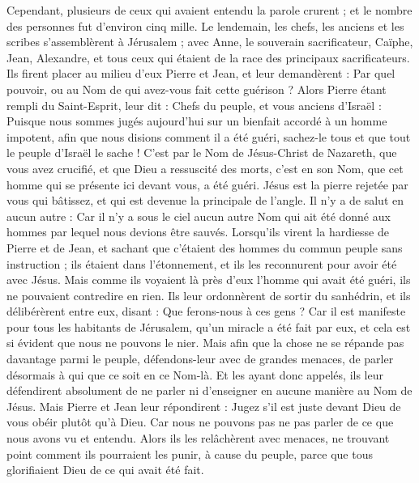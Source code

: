 \begin{multicols}{2}
Cependant, plusieurs de ceux qui avaient entendu la parole crurent ; et le nombre des personnes fut d'environ cinq mille.
Le lendemain, les chefs, les anciens et les scribes s'assemblèrent à Jérusalem ;
avec Anne, le souverain sacrificateur, Caïphe, Jean, Alexandre, et tous ceux qui étaient de la race des principaux sacrificateurs.
Ils firent placer au milieu d’eux Pierre et Jean, et leur demandèrent : Par quel pouvoir, ou au Nom de qui avez-vous fait cette guérison ?
Alors Pierre étant rempli du Saint-Esprit, leur dit : Chefs du peuple, et vous anciens d'Israël :
Puisque nous sommes jugés aujourd'hui sur un bienfait accordé à un homme impotent, afin que nous disions comment il a été guéri,
sachez-le tous et que tout le peuple d'Israël le sache ! C’est par le Nom de Jésus-Christ de Nazareth, que vous avez crucifié, et que Dieu a ressuscité des morts, c’est en son Nom, que cet homme qui se présente ici devant vous, a été guéri.
Jésus est la pierre rejetée par vous qui bâtissez, et qui est devenue la principale de l’angle.
Il n'y a de salut en aucun autre : Car il n'y a sous le ciel aucun autre Nom qui ait été donné aux hommes par lequel nous devions être sauvés.
Lorsqu’ils virent la hardiesse de Pierre et de Jean, et sachant que c’étaient des hommes du commun peuple sans instruction ; ils étaient dans l’étonnement, et ils les reconnurent pour avoir été avec Jésus.
Mais comme ils voyaient là près d’eux l'homme qui avait été guéri, ils ne pouvaient contredire en rien.
Ils leur ordonnèrent de sortir du sanhédrin, et ils délibérèrent entre eux, disant : Que ferons-nous à ces gens ?
Car il est manifeste pour tous les habitants de Jérusalem, qu'un miracle a été fait par eux, et cela est si évident que nous ne pouvons le nier.
Mais afin que la chose ne se répande pas davantage parmi le peuple, défendons-leur avec de grandes menaces, de parler désormais à qui que ce soit en ce Nom-là.
Et les ayant donc appelés, ils leur défendirent absolument de ne parler ni d’enseigner en aucune manière au Nom de Jésus.
Mais Pierre et Jean leur répondirent : Jugez s'il est juste devant Dieu de vous obéir plutôt qu'à Dieu.
Car nous ne pouvons pas ne pas parler de ce que nous avons vu et entendu.
Alors ils les relâchèrent avec menaces, ne trouvant point comment ils pourraient les punir, à cause du peuple, parce que tous glorifiaient Dieu de ce qui avait été fait.

\end{multicols}
